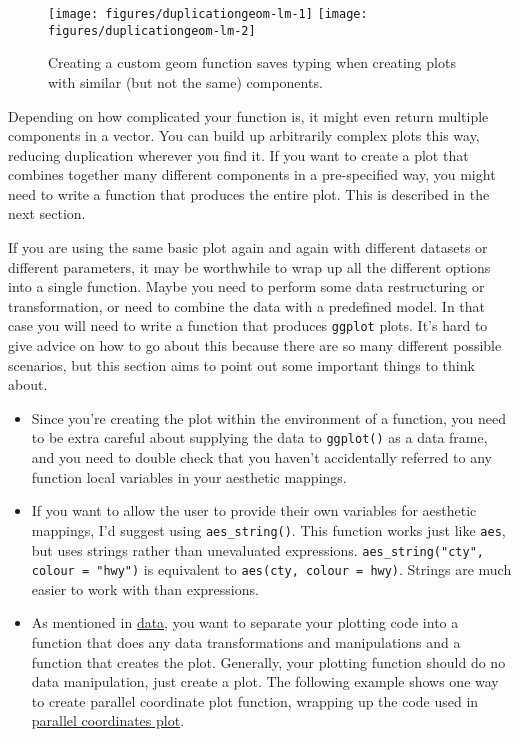 \begin{figure}
\texttt{[image: figures/duplicationgeom-lm-1]} \texttt{[image: figures/duplicationgeom-lm-2]} \caption{Creating a custom geom function saves typing when creating plots with similar (but not the same) components.\label{fig:geom-lm}}
\end{figure}

Depending on how complicated your function is, it might even return
multiple components in a vector. You can build up arbitrarily complex
plots this way, reducing duplication wherever you find it. If you want
to create a plot that combines together many different components in a
pre-specified way, you might need to write a function that produces the
entire plot. This is described in the next section.


If you are using the same basic plot again and again with different
datasets or different parameters, it may be worthwhile to wrap up all
the different options into a single function. Maybe you need to perform
some data restructuring or transformation, or need to combine the data
with a predefined model. In that case you will need to write a function
that produces \texttt{ggplot} plots. It's hard to give advice on how to
go about this because there are so many different possible scenarios,
but this section aims to point out some important things to think about.
 

\begin{itemize}
\itemsep1pt\parskip0pt
\item
  Since you're creating the plot within the environment of a function,
  you need to be extra careful about supplying the data to
  \texttt{ggplot()} as a data frame, and you need to double check that
  you haven't accidentally referred to any function local variables in
  your aesthetic mappings.
\item
  If you want to allow the user to provide their own variables for
  aesthetic mappings, I'd suggest using \texttt{aes\_string()}. This
  function works just like \texttt{aes}, but uses strings rather than
  unevaluated expressions. \texttt{aes\_string("cty", colour = "hwy")}
  is equivalent to \texttt{aes(cty, colour = hwy)}. Strings are much
  easier to work with than expressions.
   
\item
  As mentioned in \hyperref[cha:data]{data}, you want to separate your
  plotting code into a function that does any data transformations and
  manipulations and a function that creates the plot. Generally, your
  plotting function should do no data manipulation, just create a plot.
  The following example shows one way to create parallel coordinate plot
  function, wrapping up the code used in
  \hyperref[sub:molten-data]{parallel coordinates plot}.
\end{itemize}

